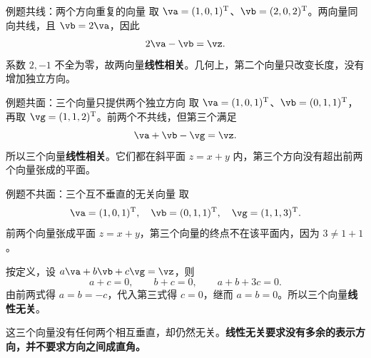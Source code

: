 \documentclass[a4paper,12pt,twoside,openany,fontset=none]{ctexbook}
\newcounter{example}[chapter]
\newenvironment{example}[1][]{\begin{exBox}{例题}{#1}}{\end{exBox}}
\numberwithin{equation}{chapter}
\begin{document}
\begin{example}[共线：两个方向重复的向量]
取 $\va=(1,0,1)^{\mathrm T}$、$\vb=(2,0,2)^{\mathrm T}$。两向量同向共线，且 $\vb=2\va$，因此
\[
    2\va-\vb=\vz.
\]
系数 $2,-1$ 不全为零，故两向量\textbf{线性相关}。几何上，第二个向量只改变长度，没有增加独立方向。
\end{example}

\begin{example}[共面：三个向量只提供两个独立方向]
取 $\va=(1,0,1)^{\mathrm T}$、$\vb=(0,1,1)^{\mathrm T}$，再取 $\vg=(1,1,2)^{\mathrm T}$。前两个不共线，但第三个满足
\[
    \va+\vb-\vg=\vz.
\]
所以三个向量\textbf{线性相关}。它们都在斜平面 $z=x+y$ 内，第三个方向没有超出前两个向量张成的平面。
\end{example}

\begin{example}[不共面：三个互不垂直的无关向量]
取
\[
    \va=(1,0,1)^{\mathrm T},\quad
    \vb=(0,1,1)^{\mathrm T},\quad
    \vg=(1,1,3)^{\mathrm T}.
\]
前两个向量张成平面 $z=x+y$，第三个向量的终点不在该平面内，因为 $3\ne1+1$。

按定义，设 $a\va+b\vb+c\vg=\vz$，则
\[
    a+c=0,\qquad b+c=0,\qquad a+b+3c=0.
\]
由前两式得 $a=b=-c$，代入第三式得 $c=0$，继而 $a=b=0$。所以三个向量\textbf{线性无关}。

这三个向量没有任何两个相互垂直，却仍然无关。\textbf{线性无关要求没有多余的表示方向，并不要求方向之间成直角。}
\end{example}
\end{document}
